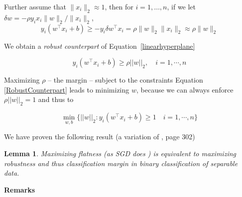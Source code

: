 \documentclass[10pt]{article}
\newtheorem{lemma}{Lemma}
\begin{document}
Further assume that $\|x_i\|_2 \approx 1$, then for $i=1,\ldots,n$, if we let $\delta w=-\rho
y_ix_i\|w\|_2/\|x_i\|_2$,
\[
  y_i (w^\intercal x_i + b) \geq -y_i \delta w^\intercal x_i = \rho\|w\|_2 \|x_i\|_2 \approx
  \rho\|w\|_2
\]

We obtain a  \emph{robust counterpart} of
Equation~\eqref{linearhyperplane}  

\begin{equation}
y_i(w^\intercal x_i + b) \geq  \rho ||w||_2, \quad i=1, \cdots,n
\label{RobustCounterpart}
\end{equation}



Maximizing $\rho$ -- the margin -- subject to the constraints  Equation
\eqref{RobustCounterpart} leads to minimizing $w$,  because we can
always enforce $\rho ||w||_2=1$ and thus to


\begin{equation}
\min_{w,b} \{||w||_2 : y_i(w^\intercal x_i + b) \geq 1 \quad  i=1,
\cdots,n \}
\label{RobustOptimization}
\end{equation}

\noindent

We have proven the following result (a variation of 
\cite{BEN:09}, page 302)

\begin{lemma}
\label{robustness-lemma}
Maximizing flatness (as SGD does \cite{Theory_IIb}) is
equivalent to maximizing robustness and thus classification margin in
binary classification of separable data.
\end{lemma}


{\bf Remarks}
\end{document}
